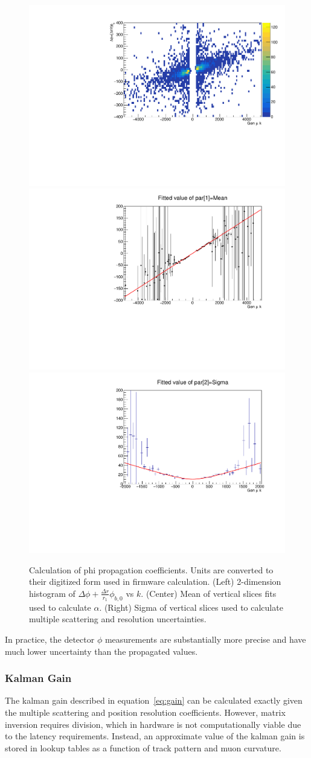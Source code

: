 \begin{figure}[htb!]
	\centering
	\includegraphics[width=0.32\linewidth]{figs/04_muons/phiprop_2d.pdf}
	\includegraphics[width=0.32\linewidth]{figs/04_muons/phiprop_mean.pdf}
	\includegraphics[width=0.32\linewidth]{figs/04_muons/phiprop_sigma.pdf}
	\caption[Calculation of phi propagation coefficients. Units are converted to their digitized form used in firmware calculation. (Left) 2-dimension histogram of $\Delta\phi+\frac{\Delta r}{r_1}\phi_{b,0}$ vs $k$. (Center) Mean of vertical slices fits used to calculate $\alpha$. (Right) Sigma of vertical slices used to calculate multiple scattering and resolution uncertainties.]
	{Calculation of phi propagation coefficients. Units are converted to their digitized form used in firmware calculation. (Left) 2-dimension histogram of $\Delta\phi+\frac{\Delta r}{r_1}\phi_{b,0}$ vs $k$. (Center) Mean of vertical slices fits used to calculate $\alpha$. (Right) Sigma of vertical slices used to calculate multiple scattering and resolution uncertainties.}
	\label{fig:phi_prop}
\end{figure}

In practice, the detector $\phi$ measurements are substantially more precise and have much lower uncertainty than the propagated values.

\subsubsection{Kalman Gain} \label{sec:kbmtf_gain}
The kalman gain described in equation~\ref{eq:gain} can be calculated exactly given the multiple scattering and position resolution coefficients. However, matrix inversion requires division, which in hardware is not computationally viable due to the latency requirements. Instead, an approximate value of the kalman gain is stored in lookup tables as a function of track pattern and muon curvature.